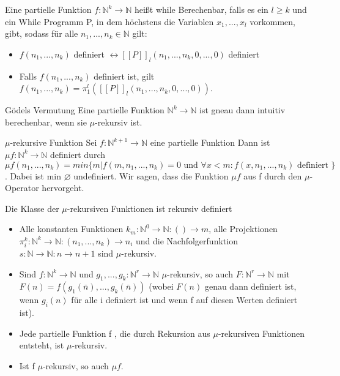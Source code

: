 \documentclass[avery5371]{flashcards}
\begin{document}
\begin{flashcard}[Definition]{} Eine partielle Funktion $f:\mathbb{N}^k\rightarrow\mathbb{N}$ heißt while Berechenbar, falls es ein $l\geq k$ und ein While Programm P, in dem höchstens die Variablen $x_1,...,x_l$ vorkommen, gibt, sodass für alle $n_1,...,n_k\in\mathbb{N}$ gilt:\begin{itemize}
\item $f(n_1,...,n_k)$ definiert $\leftrightarrow [[P]]_l(n_1,...,n_k,0,...,0)$ definiert
\item Falls $f(n_1,...,n_k)$ definiert ist, gilt $f(n_1,...,n_k)=\pi_1^l ([[P]]_l(n_1,...,n_k,0,...,0))$.
\end{itemize}
\end{flashcard}

\begin{flashcard}[Definition]{ Gödels Vermutung}
Eine partielle Funktion $\mathbb{N}^k\rightarrow\mathbb{N}$ ist gneau dann intuitiv berechenbar, wenn sie $\mu$-rekursiv ist.
\end{flashcard}

\begin{flashcard}[Definition]{$\mu$-rekursive Funktion} Sei $f:\mathbb{N}^{k+1}\rightarrow\mathbb{N}$ eine partielle Funktion Dann ist $\mu f:\mathbb{N}^k\rightarrow\mathbb{N}$ definiert durch $\mu f(n_1,...,n_k)= min\{m| f(m,n_1,...,n_k)=0 \text{ und } \forall x< m: f(x,n_1,...,n_k) \text{ definiert } \}$. Dabei ist min $\varnothing$ undefiniert. Wir sagen, dass die Funktion $\mu f$ aus f durch den $\mu$-Operator hervorgeht.
\end{flashcard}

\begin{flashcard}[Definition]{Die Klasse der $\mu$-rekursiven Funktionen ist rekursiv definiert}
\begin{itemize} 
\item Alle konstanten Funktionen $k_m:\mathbb{N}^0\rightarrow\mathbb{N}:()\rightarrow m$, alle Projektionen $\pi_i^k:\mathbb{N}^k\rightarrow \mathbb{N}: (n_1,...,n_k)\rightarrow n_i$ und die Nachfolgerfunktion $s:\mathbb{N}\rightarrow \mathbb{N}:n\rightarrow n+1$ sind $\mu$-rekursiv.
\item Sind $f:\mathbb{N}^k \rightarrow \mathbb{N}$ und $g_1,...,g_k:\mathbb{N}^r\rightarrow\mathbb{N}$ $\mu$-rekursiv, so auch $F:\mathbb{N}^r\rightarrow\mathbb{N}$ mit $F(n) = f(g_1(\bar{n}),..., g_k(\bar{n}))$ (wobei $F(n)$ genau dann definiert ist, wenn $g_i(n)$ für alle i definiert ist und wenn f auf diesen Werten definiert ist).
\item Jede partielle Funktion f , die durch Rekursion aus $\mu$-rekursiven Funktionen entsteht, ist $\mu$-rekursiv.
\item Ist f $\mu$-rekursiv, so auch $\mu f$. 
\end{itemize}
\end{flashcard}
\end{document}
